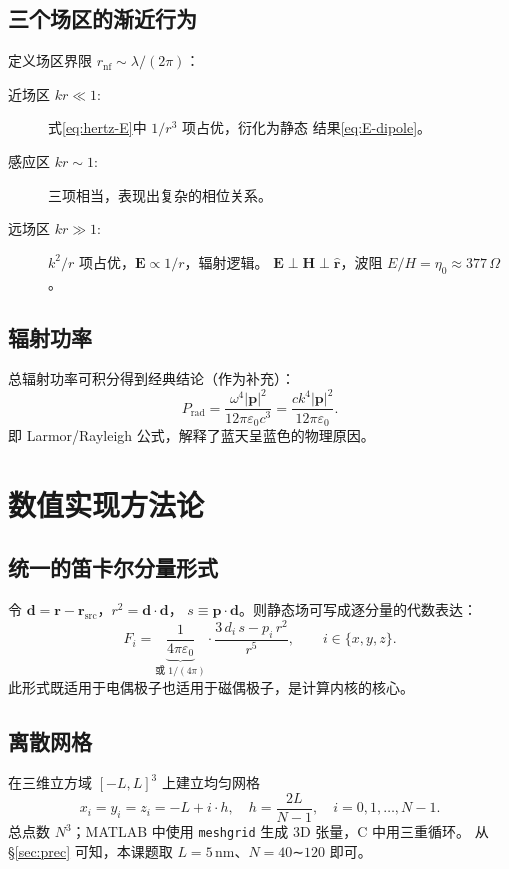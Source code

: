 \documentclass[11pt,a4paper]{article}
\newcommand{\epso}{\varepsilon_{0}}
\newcommand{\rhat}{\hat{\bm r}}
\newcommand{\pvec}{\bm p}
\newcommand{\Evec}{\bm E}
\newcommand{\Hvec}{\bm H}
\newcommand{\rvec}{\bm r}
\begin{document}
\subsection{三个场区的渐近行为}
定义场区界限 $r_{\text{nf}}\sim\lambda/(2\pi)$：
\begin{description}
    \item[近场区 $kr\ll 1$:] 式\eqref{eq:hertz-E}中 $1/r^{3}$ 项占优，衍化为静态
          结果\eqref{eq:E-dipole}。
    \item[感应区 $kr\sim 1$:] 三项相当，表现出复杂的相位关系。
    \item[远场区 $kr\gg 1$:] $k^{2}/r$ 项占优，$\Evec\propto 1/r$，辐射逻辑。
          $\Evec\perp\Hvec\perp\rhat$，波阻 $E/H=\eta_{0}\approx 377\,\Omega$。
\end{description}

\subsection{辐射功率}
总辐射功率可积分得到经典结论（作为补充）：
\begin{equation}
    P_{\text{rad}} = \frac{\omega^{4}|\pvec|^{2}}{12\pi\epso c^{3}}
                   = \frac{ck^{4}|\pvec|^{2}}{12\pi\epso}.
\end{equation}
即 Larmor/Rayleigh 公式，解释了蓝天呈蓝色的物理原因。

\section{数值实现方法论}

\subsection{统一的笛卡尔分量形式}
令 $\bm d=\rvec-\rvec_{\text{src}}$，$r^{2}=\bm d\cdot\bm d$，
$s\equiv \pvec\cdot\bm d$。则静态场可写成逐分量的代数表达：
\begin{equation}
    F_{i}=\underbrace{\frac{1}{4\pi\epso}}_{\text{或 }1/(4\pi)}
          \cdot\frac{3\,d_{i}\,s - p_{i}\,r^{2}}{r^{5}},
    \qquad i\in\{x,y,z\}.
    \label{eq:kernel-cartesian}
\end{equation}
此形式既适用于电偶极子也适用于磁偶极子，是计算内核的核心。

\subsection{离散网格}
在三维立方域 $[-L,L]^{3}$ 上建立均匀网格
\begin{equation}
    x_{i}=y_{i}=z_{i} = -L + i\cdot h,\quad h=\frac{2L}{N-1},\quad i=0,1,\ldots,N-1.
\end{equation}
总点数 $N^{3}$；MATLAB 中使用 \verb|meshgrid| 生成 3D 张量，C 中用三重循环。
从 \S\ref{sec:prec} 可知，本课题取 $L=5\,\mathrm{nm}$、$N=40$∼$120$ 即可。
\end{document}
